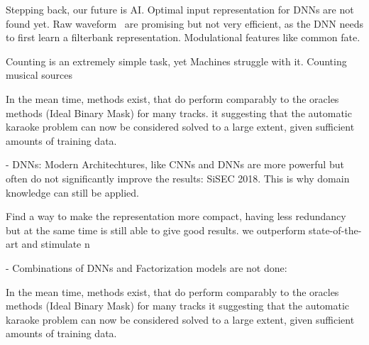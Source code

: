 Stepping back, our future is AI.
Optimal input representation for DNNs are not found yet. Raw waveform~\cite{Dieleman14, wavenet?} are promising but not very efficient, as the DNN needs to first learn a filterbank representation. Modulational features like common fate.

Counting is an extremely simple task, yet Machines struggle with it. 
Counting musical sources

  In the mean time\cite{stoeter18},  methods exist, that do perform comparably to the oracles methods (Ideal Binary Mask) for many tracks.
 it suggesting that the automatic karaoke problem can now be considered
solved to a large extent, given sufficient amounts of training data.


- DNNs: Modern Architechtures, like CNNs and DNNs are more powerful but often do not significantly improve the results: SiSEC 2018. This is why domain knowledge can still be applied.

Find a way to make the representation more compact, having less redundancy but at the same time is still able to give good results.
we outperform state-of-the-art and stimulate n

- Combinations of DNNs and Factorization models are not done: ~\cite{vu16, leroux15}


In the mean time\cite{stoeter18}, methods exist, that do perform comparably to the oracles methods (Ideal Binary Mask) for many tracks it suggesting that the automatic karaoke problem can now be considered
solved to a large extent, given sufficient amounts of training data.